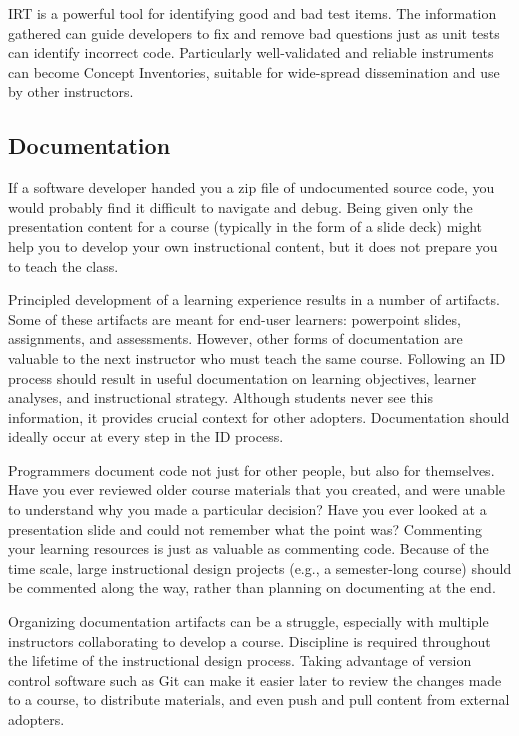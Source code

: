 IRT is a powerful tool for identifying good and bad test items.
The information gathered can guide developers to fix and remove bad questions just as unit tests can identify incorrect code.
Particularly well-validated and reliable instruments can become Concept Inventories, suitable for wide-spread dissemination and use by other instructors.


\subsection{Documentation}

If a software developer handed you a zip file of undocumented source code, you would probably find it difficult to navigate and debug.
Being given only the presentation content for a course (typically in the form of a slide deck) might help you to develop your own instructional content, but it does not prepare you to teach the class.

Principled development of a learning experience results in a number of artifacts.
Some of these artifacts are meant for end-user learners: powerpoint slides, assignments, and assessments.
However, other forms of documentation are valuable to the next instructor who must teach the same course.
Following an ID process should result in useful documentation on learning objectives, learner analyses, and instructional strategy.
Although students never see this information, it provides crucial context for other adopters.
Documentation should ideally occur at every step in the ID process.

Programmers document code not just for other people, but also for themselves.
Have you ever reviewed older course materials that you created, and were unable to understand why you made a particular decision?
Have you ever looked at a presentation slide and could not remember what the point was?
Commenting your learning resources is just as valuable as commenting code.
Because of the time scale, large instructional design projects (e.g., a semester-long course) should be commented along the way, rather than planning on documenting at the end.

Organizing documentation artifacts can be a struggle, especially with multiple instructors collaborating to develop a course.
Discipline is required throughout the lifetime of the instructional design process.
Taking advantage of version control software such as Git can make it easier later to review the changes made to a course, to distribute materials, and even push and pull content from external adopters.

